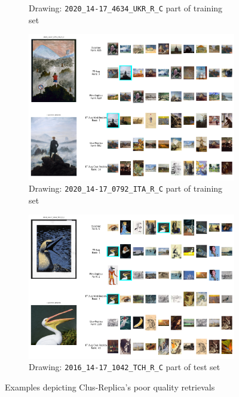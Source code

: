 {\begin{landscape}
\begin{figure}
\begin{subfigure}[b]{0.55\textwidth}
         \caption{Drawing: \texttt{2020\_14-17\_4634\_UKR\_R\_C} part of training set}
         \label{fig:2020_14-17_4634_UKR_R_C_crop1}
     \end{subfigure}
     \hfil
     \begin{subfigure}[b]{0.55\textwidth}
         \centering
         \includegraphics[width=1.01\textwidth]{images/qualitative_analysis/2020_14-17_0792_ITA_R_C.png}
         \caption{Drawing: \texttt{2020\_14-17\_0792\_ITA\_R\_C} part of training set}
         \label{fig:2020_14-17_0792_ITA_R_C}
     \end{subfigure}
     \hfil
     \begin{subfigure}[b]{0.55\textwidth}
         \centering
         \includegraphics[width=1.01\textwidth]{images/qualitative_analysis/2016_14-17_1042_TCH_R_C.png}
         \caption{Drawing: \texttt{2016\_14-17\_1042\_TCH\_R\_C} part of test set}
         \label{fig:2016_14-17_1042_TCH_R_C}
     \end{subfigure}
        \caption{Examples depicting Clus-Replica's poor quality retrievals}
        \label{fig:replica-differences}
\end{figure}

    \end{landscape}
    \clearpage
}

